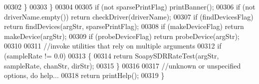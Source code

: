 \begin{DoxyCode}
00302         \}
00303     \}
00304 
00305     \textcolor{keywordflow}{if} (not sparsePrintFlag) printBanner();
00306     \textcolor{keywordflow}{if} (not driverName.empty()) \textcolor{keywordflow}{return} checkDriver(driverName);
00307     \textcolor{keywordflow}{if} (findDevicesFlag) \textcolor{keywordflow}{return} findDevices(argStr, sparsePrintFlag);
00308     \textcolor{keywordflow}{if} (makeDeviceFlag)  \textcolor{keywordflow}{return} makeDevice(argStr);
00309     \textcolor{keywordflow}{if} (probeDeviceFlag) \textcolor{keywordflow}{return} probeDevice(argStr);
00310 
00311     \textcolor{comment}{//invoke utilities that rely on multiple arguments}
00312     \textcolor{keywordflow}{if} (sampleRate != 0.0)
00313     \{
00314         \textcolor{keywordflow}{return} SoapySDRRateTest(argStr, sampleRate, chanStr, dirStr);
00315     \}
00316 
00317     \textcolor{comment}{//unknown or unspecified options, do help...}
00318     \textcolor{keywordflow}{return} printHelp();
00319 \}
\end{DoxyCode}
